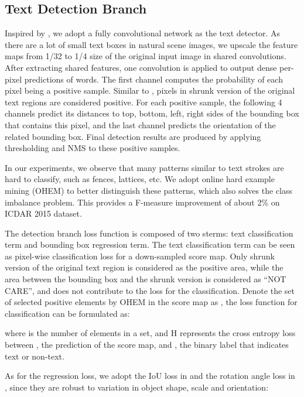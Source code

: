 \documentclass[10pt,twocolumn,letterpaper]{article}
\begin{document}
\subsection{Text Detection Branch}
\label{detect}
Inspired by \cite{zhou2017east,he2017casia}, we adopt a fully convolutional network as the text detector. As there are a lot of small text boxes in natural scene images, we upscale the feature maps from 1/32 to 1/4 size of the original input image in shared convolutions. After extracting shared features, one convolution is applied to output dense per-pixel predictions of words. The first channel computes the probability of each pixel being a positive sample. Similar to \cite{zhou2017east}, pixels in shrunk version of the original text regions are considered positive. For each positive sample, the following 4 channels predict its distances to top, bottom, left, right sides of the bounding box that contains this pixel, and the last channel predicts the orientation of the related bounding box. Final detection results are produced by applying thresholding and NMS to these positive samples.

In our experiments, we observe that many patterns similar to text strokes are hard to classify, such as fences, lattices, etc. We adopt online hard example mining (OHEM) \cite{shrivastava2016ohem} to better distinguish these patterns, which also solves the class imbalance problem. This provides a F-measure improvement of about 2\% on ICDAR 2015 dataset.

The detection branch loss function is composed of two sterms: text classification term and bounding box regression term. The text classification term can be seen as pixel-wise classification loss for a down-sampled score map. Only shrunk version of the original text region is considered as the positive area, while the area between the bounding box and the shrunk version is considered as ``NOT CARE'', and does not contribute to the loss for the classification. Denote the set of selected positive elements by OHEM in the score map as , the loss function for classification can be formulated as:

where  is the number of elements in a set, and H represents the cross entropy loss between , the prediction of the score map, and , the binary label that indicates text or non-text.

As for the regression loss, we adopt the IoU loss in \cite{yu2016unitbox} and the rotation angle loss in \cite{zhou2017east}, since they are robust to variation in object shape, scale and orientation:
\end{document}
